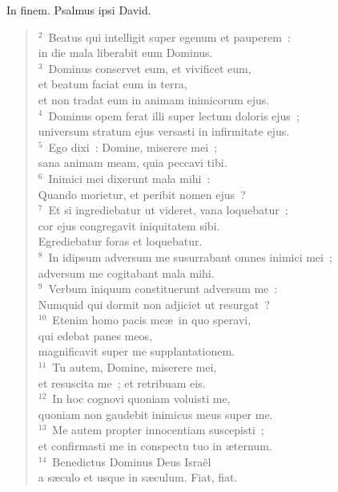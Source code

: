 \bchapter
\lettrine[lines=3,image=true,loversize=0.05,lraise=-0.03]{I}{}n finem. Psalmus ipsi David.
\begin{flushleft}\begin{verse}\vspace{6pt}${}^{2}$~Beatus qui intelligit super egenum et pauperem~:\\ in die mala liberabit eum Dominus.\\
${}^{3}$~Dominus conservet eum, et vivificet eum,\\ et beatum faciat eum in terra,\\ et non tradat eum in animam inimicorum ejus.\\
${}^{4}$~Dominus opem ferat illi super lectum doloris ejus~;\\ universum stratum ejus versasti in infirmitate ejus.\\
${}^{5}$~Ego dixi~: Domine, miserere mei~;\\ sana animam meam, quia peccavi tibi.\\
${}^{6}$~Inimici mei dixerunt mala mihi~:\\ Quando morietur, et peribit nomen ejus~?\\
${}^{7}$~Et si ingrediebatur ut videret, vana loquebatur~;\\ cor ejus congregavit iniquitatem sibi.\\ Egrediebatur foras et loquebatur.\\
${}^{8}$~In idipsum adversum me susurrabant omnes inimici mei~;\\ adversum me cogitabant mala mihi.\\
${}^{9}$~Verbum iniquum constituerunt adversum me~:\\ Numquid qui dormit non adjiciet ut resurgat~?\\
${}^{10}$~Etenim homo pacis me\ae\ in quo speravi,\\ qui edebat panes meos,\\ magnificavit super me supplantationem.\\
${}^{11}$~Tu autem, Domine, miserere mei,\\ et resuscita me~; et retribuam eis.\\
${}^{12}$~In hoc cognovi quoniam voluisti me,\\ quoniam non gaudebit inimicus meus super me.\\
${}^{13}$~Me autem propter innocentiam suscepisti~;\\ et confirmasti me in conspectu tuo in \ae ternum.\\
${}^{14}$~Benedictus Dominus Deus Isra\"el\\ a s\ae culo et usque in s\ae culum. Fiat, fiat.\end{verse}\end{flushleft}




